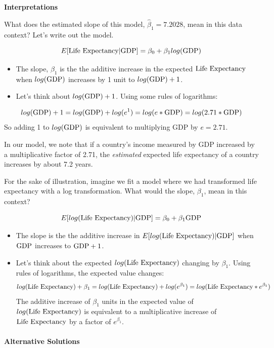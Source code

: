 \documentclass[
]{book}
\begin{document}
\textbf{Interpretations}

What does the estimated slope of this model, \(\hat{\beta}_1 = 7.2028\), mean in this data context? Let's write out the model.

\[E[\hbox{Life Expectancy} | \hbox{GDP} ] = \beta_0 + \beta_1 log(\hbox{GDP})\]

\begin{itemize}
\item
  The slope, \(\beta_1\) is the the additive increase in the expected \(\hbox{Life Expectancy}\) when \(log(\hbox{GDP})\) increases by 1 unit to \(log(\hbox{GDP}) + 1\).
\item
  Let's think about \(log(\hbox{GDP}) + 1\). Using some rules of logarithms:
\end{itemize}

\[log(\hbox{GDP}) + 1 = log(\hbox{GDP}) + log(e^1) = log(e*\hbox{GDP}) = log(2.71*\hbox{GDP})\]
So adding 1 to \(log(\hbox{GDP})\) is equivalent to multiplying GDP by \(e=2.71\).

In our model, we note that if a country's income measured by GDP increased by a multiplicative factor of 2.71, the \emph{estimated} expected life expectancy of a country increases by about 7.2 years.

For the sake of illustration, imagine we fit a model where we had transformed life expectancy with a log transformation. What would the slope, \(\beta_1\), mean in this context?

\[E[log(\hbox{Life Expectancy}) | \hbox{GDP} ] = \beta_0 + \beta_1 \hbox{GDP}\]

\begin{itemize}
\item
  The slope is the the additive increase in \(E[log(\hbox{Life Expectancy}) | \hbox{GDP} ]\) when \(\hbox{GDP}\) increases to \(\hbox{GDP} + 1\).
\item
  Let's think about the expected \(log(\hbox{Life Expectancy})\) changing by \(\beta_1\). Using rules of logarithms, the expected value changes:
  \[log(\hbox{Life Expectancy}) + \beta_1 = log(\hbox{Life Expectancy}) + log(e^{\beta_1}) = log(\hbox{Life Expectancy} * e^{\beta_1}) \]
  The additive increase of \(\beta_1\) units in the expected value of \(log(\hbox{Life Expectancy})\) is equivalent to a multiplicative increase of \(\hbox{Life Expectancy}\) by a factor of \(e^{\beta_1}\).
\end{itemize}

\hypertarget{alternative-solutions}{%
\paragraph{Alternative Solutions}\label{alternative-solutions}}
\end{document}
